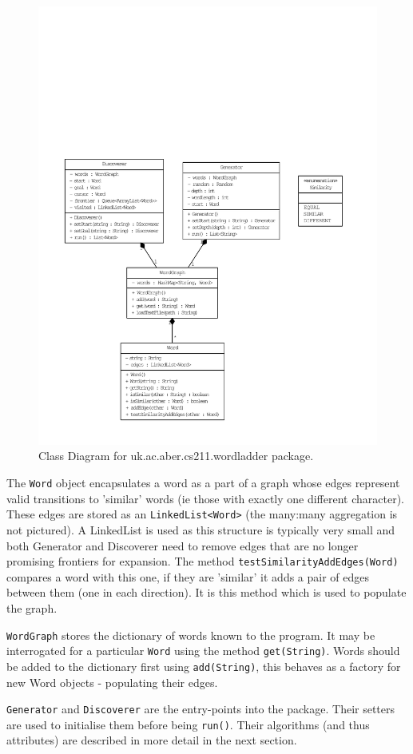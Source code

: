 \documentclass[11pt]{article} %
\begin{document}
\begin{figure}[h!]
\includegraphics[width=\textwidth]{ClassDiagram}
\caption{Class Diagram for uk.ac.aber.cs211.wordladder package.}
\end{figure}

The \texttt{Word} object encapsulates a word as a part of a graph whose edges represent valid transitions to 'similar' words (ie those with exactly one different character). These edges are stored as an \texttt{LinkedList<Word>} (the many:many aggregation is not pictured). A LinkedList is used as this structure is typically very small and both Generator and Discoverer need to remove edges that are no longer promising frontiers for expansion. The method \texttt{testSimilarityAddEdges(Word)} compares a word with this one, if they are 'similar' it adds a pair of edges between them (one in each direction). It is this method which is used to populate the graph.

\texttt{WordGraph} stores the dictionary of words known to the program. It may be interrogated for a particular \texttt{Word} using the method \texttt{get(String)}. Words should be added to the dictionary first using \texttt{add(String)}, this behaves as a factory for new Word objects - populating their edges.

\texttt{Generator} and \texttt{Discoverer} are the entry-points into the package. Their setters are used to initialise them before being \texttt{run()}. Their algorithms (and thus attributes) are described in more detail in the next section.
\end{document}
